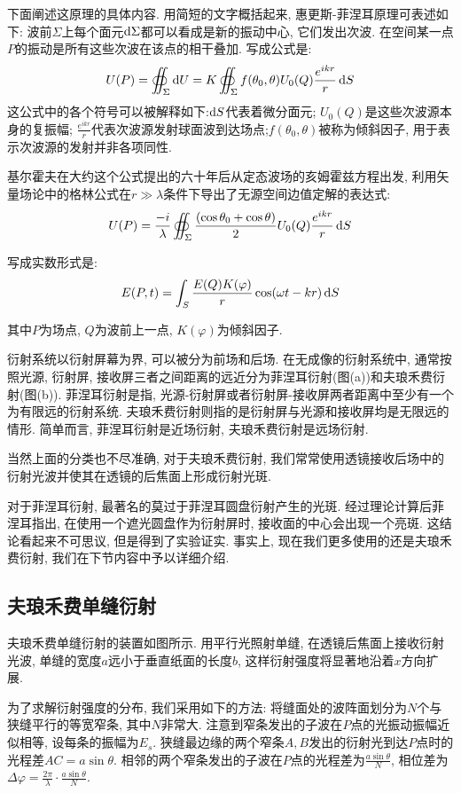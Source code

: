 
下面阐述这原理的具体内容. 用简短的文字概括起来, 惠更斯-菲涅耳原理可表述如下: 波前$\Sigma$上每个面元$\mathop{}\!\mathrm{d} \Sigma$都可以看成是新的振动中心, 它们发出次波. 在空间某一点$P$的振动是所有这些次波在该点的相干叠加. 写成公式是:
\[
U(P) = \oiint_{\Sigma} \mathop{}\!\mathrm{d} U =  K \oiint_{\Sigma} f(\theta_0,\theta)U_0(Q)\frac{e^{ikr}}{r}\mathop{}\!\mathrm{d} S
\]
这公式中的各个符号可以被解释如下:$\mathop{}\!\mathrm{d} S$代表着微分面元; $U_0(Q)$是这些次波源本身的复振幅; $\frac{e^{ikr}}{r}$代表次波源发射球面波到达场点;$f(\theta_0,\theta)$被称为倾斜因子, 用于表示次波源的发射并非各项同性.

基尔霍夫在大约这个公式提出的六十年后从定态波场的亥姆霍兹方程出发, 利用矢量场论中的格林公式在$r\gg \lambda$条件下导出了无源空间边值定解的表达式:
\[
U(P) = \frac{-i}{\lambda} \oiint_{\Sigma} \frac{(\cos\theta_0+\cos\theta)}{2}U_0(Q)\frac{e^{ikr}}{r}\mathop{}\!\mathrm{d} S
\]

写成实数形式是:
\[
E(P,t) = \int_S \frac{E(Q)K(\varphi)}{r} \cos(\omega t-kr)\mathop{}\!\mathrm{d} S
\]

其中$P$为场点, $Q$为波前上一点, $K(\varphi)$为倾斜因子.


衍射系统以衍射屏幕为界, 可以被分为前场和后场. 在无成像的衍射系统中, 通常按照光源, 衍射屏, 接收屏三者之间距离的远近分为菲涅耳衍射(图(a))和夫琅禾费衍射(图(b)). 菲涅耳衍射是指, 光源-衍射屏或者衍射屏-接收屏两者距离中至少有一个为有限远的衍射系统. 夫琅禾费衍射则指的是衍射屏与光源和接收屏均是无限远的情形. 简单而言, 菲涅耳衍射是近场衍射, 夫琅禾费衍射是远场衍射.

当然上面的分类也不尽准确, 对于夫琅禾费衍射, 我们常常使用透镜接收后场中的衍射光波并使其在透镜的后焦面上形成衍射光斑.

对于菲涅耳衍射, 最著名的莫过于菲涅耳圆盘衍射产生的光斑. 经过理论计算后菲涅耳指出, 在使用一个遮光圆盘作为衍射屏时, 接收面的中心会出现一个亮斑. 这结论看起来不可思议, 但是得到了实验证实. 事实上, 现在我们更多使用的还是夫琅禾费衍射, 我们在下节内容中予以详细介绍.

\subsection{夫琅禾费单缝衍射}

夫琅禾费单缝衍射的装置如图所示. 用平行光照射单缝, 在透镜后焦面上接收衍射光波, 单缝的宽度$a$远小于垂直纸面的长度$b$, 这样衍射强度将显著地沿着$x$方向扩展.

为了求解衍射强度的分布, 我们采用如下的方法: 将缝面处的波阵面划分为$N$个与狭缝平行的等宽窄条, 其中$N$非常大. 注意到窄条发出的子波在$P$点的光振动振幅近似相等, 设每条的振幅为$E_s$. 狭缝最边缘的两个窄条$A,B$发出的衍射光到达$P$点时的光程差$AC= a\sin\theta$. 相邻的两个窄条发出的子波在$P$点的光程差为$\frac{a\sin\theta}{N}$, 相位差为$\Delta \varphi =\frac{2\pi}{\lambda}\cdot \frac{a\sin\theta}{N}$.

